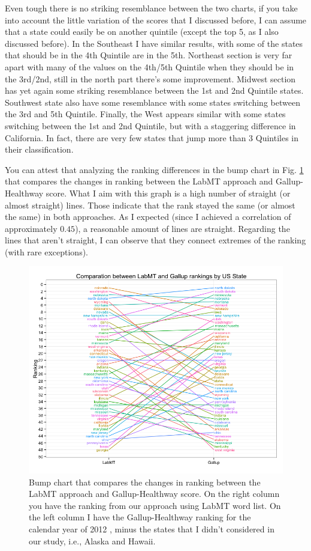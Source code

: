 \documentclass{llncs}
\begin{document}
Even tough there is no striking resemblance between the two charts, if you take into account the little variation of the scores that I discussed before, I can assume that a state could easily be on another quintile (except the top 5, as I also discussed before). In the Southeast I have similar results, with some of the states that should be in the 4th Quintile are in the 5th. Northeast section is very far apart with many of the values on the 4th/5th Quintile when they should be in the 3rd/2nd, still in the north part there's some improvement. Midwest section has yet again some striking resemblance between the 1st and 2nd Quintile states. Southwest state also have some resemblance with some states switching between the 3rd and 5th Quintile. Finally, the West appears similar with some states switching between the 1st and 2nd Quintile, but with a staggering difference in California. In fact, there are very few states that jump more than 3 Quintiles in their classification.

You can attest that analyzing the ranking differences in the bump chart in Fig. \ref{fig:bump_chart} that compares the changes in ranking between the LabMT approach and Gallup-Healthway score. What I aim with this graph is a high number of straight (or almost straight) lines. Those indicate that the rank stayed the same (or almost the same) in both approaches. As I expected (since I achieved a correlation of approximately $0.45$), a reasonable amount of lines are straight. Regarding the lines that aren't straight, I can observe that they connect extremes of the ranking (with rare exceptions).

\begin{figure}[!ht]
\centering
\includegraphics[width=\textwidth]{images/bump_chart}
\caption{Bump chart that compares the changes in ranking between the LabMT approach and Gallup-Healthway score. On the right column you have the ranking from our approach using LabMT word list. On the left column I have the Gallup-Healthway ranking for the calendar year of 2012 \cite{GallupHealthway2013}, minus the states that I didn't considered in our study, i.e., Alaska and Hawaii.}
\label{fig:bump_chart}
\end{figure}
\end{document}
